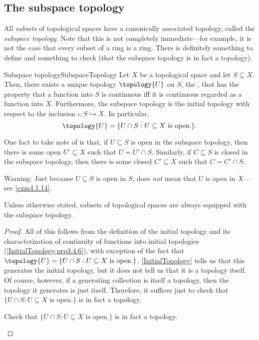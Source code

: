 \subsection{The subspace topology}

All \emph{subsets} of topological spaces have a canonically associated topology, called the \emph{subspace topology}.  Note that this is not completely immediate---for example, it is not the case that every subset of a ring is a ring.  There is definitely something to define and something to check (that the subspace topology is in fact a topology).
\begin{prp}{Subspace topology}{SubspaceTopology}
Let $X$ be a topological space and let $S\subseteq X$.  Then, there exists a unique topology $\topology{U}$ on $S$, the , that has the property that a function into $S$ is continuous iff it is continuous regarded as a function into $X$.  Furthermore, the subspace topology is the initial topology with respect to the inclusion $\iota :S\hookrightarrow X$.  In particular,
\begin{equation}
\topology{U}=\{ U\cap S:U\subseteq X\text{ is open.}\} .
\end{equation}
\begin{rmk}
One fact to take note of is that, if $U\subseteq S$ is open in the subspace topology, then there is some open $U'\subseteq X$ such that $U=U'\cap S$.  Similarly, if $C\subseteq S$ is closed in the subspace topology, then there is some closed $C'\subseteq X$ such that $C=C'\cap S$.
\end{rmk}
\begin{wrn}
Warning:  Just because $U\subseteq S$ is open in $S$, does \emph{not} mean that $U$ is open in $X$---see \cref{exm4.1.14}.
\end{wrn}
\begin{rmk}
Unless otherwise stated, subsets of topological spaces are always equipped with the subspace topology.
\end{rmk}
\begin{proof}
All of this follows from the definition of the initial topology and its characterization of continuity of functions into initial topologies (\cref{InitialTopology,prp3.4.6}), with exception of the fact that $\topology{U}=\{ U\cap S:U\subseteq X\text{ is open.}\}$.  \cref{InitialTopology} tells us that this generates the initial topology, but it does not tell us that it is a topology itself.  Of course, however, if a generating collection is itself a topology, then the topology it generates is just itself.  Therefore, it suffices just to check that $\{ U\cap S:U\subseteq X\text{ is open.}\}$ is in fact a topology.
\begin{exr}[breakable=false]{}{}
Check that $\{ U\cap S:U\subseteq X\text{ is open.}\}$ is in fact a topology.
\end{exr}
\end{proof}
\end{prp}
